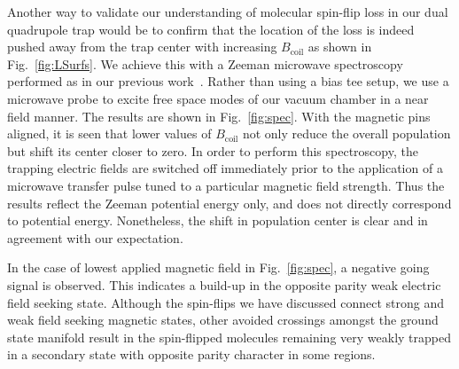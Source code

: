 \documentclass[%
 reprint,
groupedaddress,
 amsmath,amssymb,
 aps,
prl,
]{revtex4-1}
\begin{document}
Another way to validate our understanding of molecular spin-flip loss in our dual quadrupole trap would be to confirm that the location of the loss is indeed pushed away from the trap center with increasing $B_\text{coil}$ as shown in Fig.~\ref{fig:LSurfs}. We achieve this with a Zeeman microwave spectroscopy performed as in our previous work~\cite{Stuhl2012evap}. Rather than using a bias tee setup, we use a microwave probe to excite free space modes of our vacuum chamber in a near field manner. The results are shown in Fig.~\ref{fig:spec}. With the magnetic pins aligned, it is seen that lower values of $B_{\text{coil}}$ not only reduce the overall population but shift its center closer to zero. In order to perform this spectroscopy, the trapping electric fields are switched off immediately prior to the application of a microwave transfer pulse tuned to a particular magnetic field strength. Thus the results reflect the Zeeman potential energy only, and does not directly correspond to potential energy. Nonetheless, the shift in population center is clear and in agreement with our expectation.  %


In the case of lowest applied magnetic field in Fig.~\ref{fig:spec}, a negative going signal is observed. This indicates a build-up in the opposite parity weak electric field seeking state. Although the spin-flips we have discussed connect strong and weak field seeking magnetic states, other avoided crossings amongst the ground state manifold result in the spin-flipped molecules remaining very weakly trapped in a secondary state with opposite parity character in some regions. %
\end{document}
